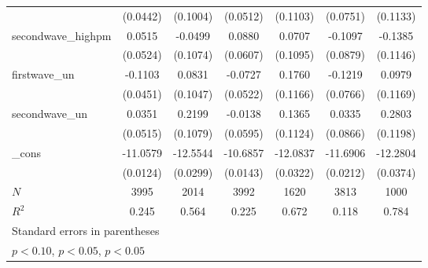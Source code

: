 \begin{table}[htbp]
\begin{tabular}{l*{6}{c}}
            &    (0.0442)         &    (0.1004)         &    (0.0512)         &    (0.1103)         &    (0.0751)         &    (0.1133)         \\
[1em]
secondwave\_highpm&      0.0515         &     -0.0499         &      0.0880         &      0.0707         &     -0.1097         &     -0.1385         \\
            &    (0.0524)         &    (0.1074)         &    (0.0607)         &    (0.1095)         &    (0.0879)         &    (0.1146)         \\
[1em]
firstwave\_un&     -0.1103\sym{***}&      0.0831         &     -0.0727         &      0.1760         &     -0.1219         &      0.0979         \\
            &    (0.0451)         &    (0.1047)         &    (0.0522)         &    (0.1166)         &    (0.0766)         &    (0.1169)         \\
[1em]
secondwave\_un&      0.0351         &      0.2199\sym{***}&     -0.0138         &      0.1365         &      0.0335         &      0.2803\sym{***}\\
            &    (0.0515)         &    (0.1079)         &    (0.0595)         &    (0.1124)         &    (0.0866)         &    (0.1198)         \\
[1em]
\_cons      &    -11.0579\sym{***}&    -12.5544\sym{***}&    -10.6857\sym{***}&    -12.0837\sym{***}&    -11.6906\sym{***}&    -12.2804\sym{***}\\
            &    (0.0124)         &    (0.0299)         &    (0.0143)         &    (0.0322)         &    (0.0212)         &    (0.0374)         \\
\hline
\(N\)       &        3995         &        2014         &        3992         &        1620         &        3813         &        1000         \\
\(R^{2}\)   &       0.245         &       0.564         &       0.225         &       0.672         &       0.118         &       0.784         \\
\hline\hline
\multicolumn{7}{l}{\footnotesize Standard errors in parentheses}\\
\multicolumn{7}{l}{\footnotesize \sym{*} \(p<0.10\), \sym{**} \(p<0.05\), \sym{***} \(p<0.05\)}\\
\end{tabular}
\end{table}
